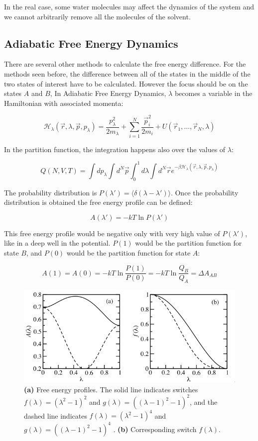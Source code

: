 	In the real case, some water molecules may affect the dynamics of the system and we cannot arbitrarily remove all the molecules of the solvent.

	\subsection{Adiabatic Free Energy Dynamics}
	There are several other methods to calculate the free energy difference.
	For the methods seen before, the difference between all of the states in the middle of the two states of interest have to be calculated.
	However the focus should be on the states $A$ and $B$,
	In Adiabatic Free Energy Dynamics, $\lambda$ becomes a variable in the Hamiltonian with associated momenta:

	$$\mathcal{H}_\lambda(\vec{r}, \lambda, \vec{p}, p_\lambda) = \frac{p_\lambda^2}{2m_\lambda} + \sum\limits_{i=1}^N\frac{\vec{p}_i^2}{2m_i} + U(\vec{r}_1, \dots, \vec{r}_N, \lambda)$$

	In the partition function, the integration happens also over the values of $\lambda$:

	$$Q(N, V, T) = \int dp_\lambda\int d^N\vec{p}\int_0^1d\lambda\int d^N\vec{r}e^{-\beta\mathcal{H}_\lambda(\vec{r},\lambda,\vec{p}, p_\lambda)}$$

	The probability distribution is $P(\lambda') = \langle\delta(\lambda-\lambda')\rangle$.
	Once the probability distribution is obtained the free energy profile can be defined:

	$$A(\lambda') = -kT\ln P(\lambda')$$

	This free energy profile would be negative only with very high value of $P(\lambda ')$, like in a deep well in the potential.
	$P(1)$ would be the partition function for state $B$, and $P(0)$ would be the partition function for state $A$:

	$$A(1) = A(0) = -kT\ln\frac{P(1)}{P(0)} = -kT\ln\frac{Q_B}{Q_A} = \Delta A_{AB}$$

	\begin{figure}[H]
		\centering
		\includegraphics[scale = 0.5]{adiabatic-free-energy-dynamics}
		\caption{\textbf{(a)} Free energy profiles. The solid line indicates switches $f(\lambda) = (\lambda^2 - 1)^2$ and $g(\lambda) = ((\lambda - 1)^2 - 1)^2$, and the dashed line indicates $f(\lambda) = (\lambda^2 - 1)^4$ and $g(\lambda) = ((\lambda - 1)^2 - 1)^4$ . \textbf{(b)} Corresponding switch $f(\lambda)$.}
		\label{fig:adiabatic-free-energy-dynamics}
	\end{figure}

